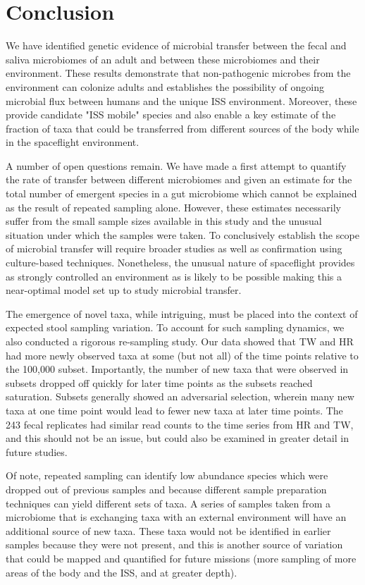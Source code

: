\section{Conclusion}

We have identified genetic evidence of microbial transfer between the fecal and saliva microbiomes of an adult and between these microbiomes and their environment. These results demonstrate that non-pathogenic microbes from the environment can colonize adults and establishes the possibility of ongoing microbial flux between humans and the unique ISS environment. Moreover, these provide candidate "ISS mobile" species and also enable a key estimate of the fraction of taxa that could be transferred from different sources of the body while in the spaceflight environment.

A number of open questions remain. We have made a first attempt to quantify the rate of transfer between different microbiomes and given an estimate for the total number of emergent species in a gut microbiome which cannot be explained as the result of repeated sampling alone. However, these estimates necessarily suffer from the small sample sizes available in this study and the unusual situation under which the samples were taken. To conclusively establish the scope of microbial transfer will require broader studies as well as confirmation using culture-based techniques. Nonetheless, the unusual nature of spaceflight provides as strongly controlled an environment as is likely to be possible making this a near-optimal model set up to study microbial transfer.

The emergence of novel taxa, while intriguing, must be placed into the context of expected stool sampling variation. To account for such sampling dynamics, we also conducted a rigorous re-sampling study. Our data showed that TW and HR had more newly observed taxa at some (but not all) of the time points relative to the 100,000 subset. Importantly, the number of new taxa that were observed in subsets dropped off quickly for later time points as the subsets reached saturation. Subsets generally showed an adversarial selection, wherein many new taxa at one time point would lead to fewer new taxa at later time points. The 243 fecal replicates had similar read counts to the time series from HR and TW, and this should not be an issue, but could also be examined in greater detail in future studies.

Of note, repeated sampling can identify low abundance species which were dropped out of previous samples and because different sample preparation techniques can yield different sets of taxa. A series of samples taken from a microbiome that is exchanging taxa with an external environment will have an additional source of new taxa. These taxa would not be identified in earlier samples because they were not present, and this is another source of variation that could be mapped and quantified for future missions (more sampling of more areas of the body and the ISS, and at greater depth).

